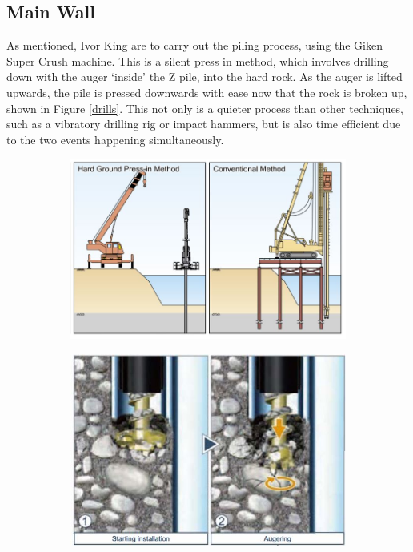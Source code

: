 \documentclass[12pt, a4paper]{article}
\begin{document}
\subsection{Main Wall}
\begin{justify}
As mentioned, Ivor King are to carry out the piling process, using the Giken Super Crush machine. This is a silent press in method, which involves drilling down with the auger `inside' the Z pile, into the hard rock. As the auger is lifted upwards, the pile is pressed downwards with ease now that the rock is broken up, shown in Figure \ref{drills}. This not only is a quieter process than other techniques, such as a vibratory drilling rig or impact hammers, but is also time efficient due to the two events happening simultaneously.
\begin{figure}[H]
  \begin{subfigure}[h]{.5\textwidth}
  \begin{center}
  	\includegraphics[height=.18\textheight]{pressin}
  	\captionsetup{justification=centering}
  	\caption{}
  	
	\label{magSim1}
	\end{center}
  \end{subfigure}
  \begin{subfigure}[h]{.5\textwidth}
  \begin{center}
  	\includegraphics[height=.18\textheight]{supercrush}
  	\captionsetup{justification=centering}


\end{center}
\end{subfigure}
\end{figure}
\end{justify}
\end{document}
